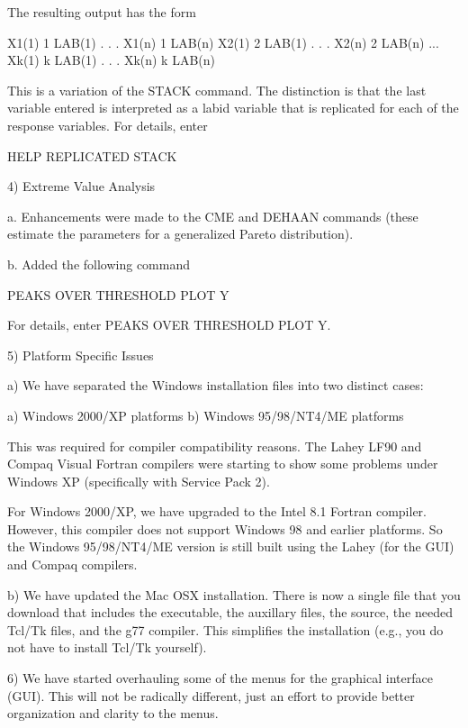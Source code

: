 {    The resulting output has the form

        X1(1)   1   LAB(1)
          .     .     .
        X1(n)   1   LAB(n)
        X2(1)   2   LAB(1)
          .     .     .
        X2(n)   2   LAB(n)
               ...
        Xk(1)   k   LAB(1)
          .     .     .
        Xk(n)   k   LAB(n)

    This is a variation of the STACK command.  The distinction is
    that the last variable entered is interpreted as a labid
    variable that is replicated for each of the response variables.
    For details, enter

        HELP REPLICATED STACK

 4) Extreme Value Analysis

    a. Enhancements were made to the CME and DEHAAN commands (these
       estimate the parameters for a generalized Pareto distribution).

    b. Added the following command

         PEAKS OVER THRESHOLD PLOT Y

       For details, enter PEAKS OVER THRESHOLD PLOT Y.

 5) Platform Specific Issues

    a) We have separated the Windows installation files into two
       distinct cases:
   
       a) Windows 2000/XP platforms
       b) Windows 95/98/NT4/ME platforms
   
       This was required for compiler compatibility reasons.  The
       Lahey LF90 and Compaq Visual Fortran compilers were starting
       to show some problems under Windows XP (specifically with
       Service Pack 2).
   
       For Windows 2000/XP, we have upgraded to the Intel 8.1
       Fortran compiler.  However, this compiler does not support
       Windows 98 and earlier platforms.  So the
       Windows 95/98/NT4/ME version is still built using the
       Lahey (for the GUI) and Compaq compilers.

    b) We have updated the Mac OSX installation.  There is now a
       single file that you download that includes the executable,
       the auxillary files, the source, the needed Tcl/Tk files,
       and the g77 compiler.  This simplifies the installation
       (e.g., you do not have to install Tcl/Tk yourself).

 6) We have started overhauling some of the menus for the graphical
    interface (GUI).  This will not be radically different, just an
    effort to provide better organization and clarity to the menus.

}
